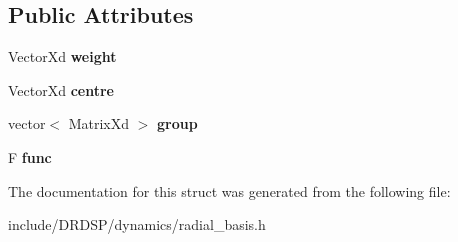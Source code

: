 \subsection*{Public Attributes}
\begin{DoxyCompactItemize}
\item 
\hypertarget{struct_d_r_d_s_p_1_1_equi_r_b_f_finite_a34a57410440eb4963e166ffffd553dfc}{Vector\-Xd {\bfseries weight}}\label{struct_d_r_d_s_p_1_1_equi_r_b_f_finite_a34a57410440eb4963e166ffffd553dfc}

\item 
\hypertarget{struct_d_r_d_s_p_1_1_equi_r_b_f_finite_a486e079665ba3bf35822af822fd0ecec}{Vector\-Xd {\bfseries centre}}\label{struct_d_r_d_s_p_1_1_equi_r_b_f_finite_a486e079665ba3bf35822af822fd0ecec}

\item 
\hypertarget{struct_d_r_d_s_p_1_1_equi_r_b_f_finite_a9ccfe5aeb651a2793021eee7d4d93495}{vector$<$ Matrix\-Xd $>$ {\bfseries group}}\label{struct_d_r_d_s_p_1_1_equi_r_b_f_finite_a9ccfe5aeb651a2793021eee7d4d93495}

\item 
\hypertarget{struct_d_r_d_s_p_1_1_equi_r_b_f_finite_a3e0bea2200d1f16b930f4bd7d88292db}{F {\bfseries func}}\label{struct_d_r_d_s_p_1_1_equi_r_b_f_finite_a3e0bea2200d1f16b930f4bd7d88292db}

\end{DoxyCompactItemize}


The documentation for this struct was generated from the following file\-:\begin{DoxyCompactItemize}
\item 
include/\-D\-R\-D\-S\-P/dynamics/radial\-\_\-basis.\-h\end{DoxyCompactItemize}
